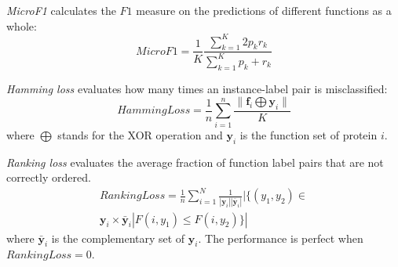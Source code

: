 \documentclass{llncs} %
\begin{document}
\emph{MicroF1} calculates the $F1$ measure on the predictions of different functions as a whole:
\begin{displaymath}
MicroF1=\frac{1}{K}\frac{\sum_{k=1}^{K} 2 p_k r_k}{\sum_{k=1}^{K} p_k+r_k}
\end{displaymath}

\begin{comment}
\emph{Average ROC} (AvgROC) score averages the receiver operation curve (ROC) score of each function. ROC Score is calculated as the area under the ROC curve, which plots true positive rate (sensitivity) as a function of false positive rate (1-specificity) under different classification thresholds \cite{gribskov1996use}. It measures the overall quality of the ranking induced by the classifier, instead of the quality of a single value of the threshold in that ranking.

\emph{Accuracy} and \textit{Completeness} were first used in \cite{qi2011mining}. Suppose the predicted function set of $n$ proteins is $F_p$, the initial incomplete annotated function set is $F_q$ and the ground truth function set is $Y$, the \textit{accuracy} is defined as:
\begin{displaymath}
Accuracy=\frac {|F_p\bigcap Y|}{|F_p|}
\end{displaymath}
and the \emph{Completeness} is:
\begin{displaymath}
Completeness=\frac {|(F_p\bigcup F_q)\bigcap Y|}{|Y|}
\end{displaymath}
\end{comment}

\emph{Hamming loss} evaluates how many times an instance-label pair is misclassified:
\begin{displaymath}
Hamming Loss=\frac{1}{n}\sum_{i=1}^{n}\frac {\|\mathbf{f}_i \bigoplus \mathbf{y}_i\|}{K}
\end{displaymath}
where $\bigoplus$ stands for the XOR operation and $\mathbf{y}_i $ is the function set of protein $i$.

\emph{Ranking loss} evaluates the average fraction of function label pairs that are not correctly ordered.
\begin{eqnarray}
RankingLoss=\frac{1}{n}\sum_{i=1}^N \frac{1}{|\mathbf{y}_i||\mathbf{\bar{y}}_i|}|
\{(y_1,y_2) \in \nonumber \\
\mathbf{y}_i \times \mathbf{\bar{y}}_i
|F(i,y_1)\leq F(i,y_2)\}|
\nonumber
\end{eqnarray}
where $\mathbf{\bar{y}}_i$ is the complementary set of $\mathbf{y}_i$. The performance is perfect when $RankingLoss=0$.
\end{document}
